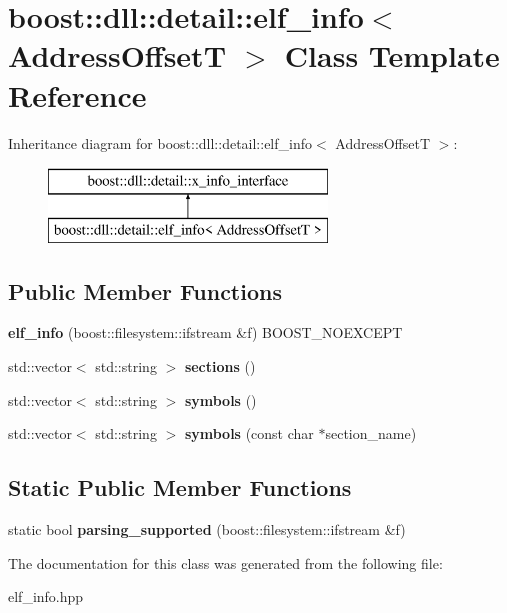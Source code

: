 \hypertarget{a00086}{}\section{boost\+:\+:dll\+:\+:detail\+:\+:elf\+\_\+info$<$ Address\+OffsetT $>$ Class Template Reference}
\label{a00086}
Inheritance diagram for boost\+:\+:dll\+:\+:detail\+:\+:elf\+\_\+info$<$ Address\+OffsetT $>$\+:\begin{figure}[H]
\begin{center}
\leavevmode
\includegraphics[height=2.000000cm]{a00086}
\end{center}
\end{figure}
\subsection*{Public Member Functions}
\begin{DoxyCompactItemize}
\item 
{\bfseries elf\+\_\+info} (boost\+::filesystem\+::ifstream \&f) B\+O\+O\+S\+T\+\_\+\+N\+O\+E\+X\+C\+E\+PT\hypertarget{a00086_a86ac2d6ccd8f1690d9fa285a20a9357e}{}\label{a00086_a86ac2d6ccd8f1690d9fa285a20a9357e}

\item 
std\+::vector$<$ std\+::string $>$ {\bfseries sections} ()\hypertarget{a00086_a14b62434f2be710f2a0a8da8fde24bca}{}\label{a00086_a14b62434f2be710f2a0a8da8fde24bca}

\item 
std\+::vector$<$ std\+::string $>$ {\bfseries symbols} ()\hypertarget{a00086_a131b0f293d358d4d75ac6f63ec365285}{}\label{a00086_a131b0f293d358d4d75ac6f63ec365285}

\item 
std\+::vector$<$ std\+::string $>$ {\bfseries symbols} (const char $\ast$section\+\_\+name)\hypertarget{a00086_a07e28e88baa3914a205693b8921d2b87}{}\label{a00086_a07e28e88baa3914a205693b8921d2b87}

\end{DoxyCompactItemize}
\subsection*{Static Public Member Functions}
\begin{DoxyCompactItemize}
\item 
static bool {\bfseries parsing\+\_\+supported} (boost\+::filesystem\+::ifstream \&f)\hypertarget{a00086_a7f38916fd4bb133614d04870406d7c62}{}\label{a00086_a7f38916fd4bb133614d04870406d7c62}

\end{DoxyCompactItemize}


The documentation for this class was generated from the following file\+:\begin{DoxyCompactItemize}
\item 
elf\+\_\+info.\+hpp\end{DoxyCompactItemize}
